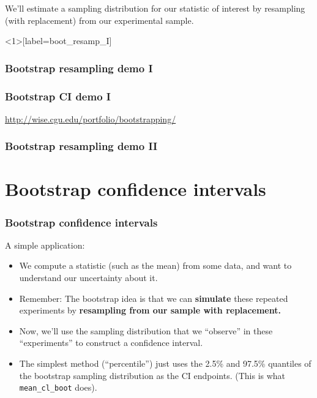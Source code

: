 \documentclass{beamer} %
\begin{document}
\begin{frame}[standout]
We'll estimate a sampling distribution for our statistic of interest by resampling (with replacement) from our experimental sample.
\end{frame}

\begin{frame}<1>[label=boot_resamp_I]
\frametitle<1>{Bootstrap resampling demo I}
\frametitle<2>{Bootstrap CI demo I}
\centering
\url{http://wise.cgu.edu/portfolio/bootstrapping/}
\end{frame}

\begin{frame}[label=boot_resamp_II]
\frametitle{Bootstrap resampling demo II}
\begin{figure}
\centering
{}
\end{figure}
\end{frame}

\section{Bootstrap confidence intervals}

\begin{frame}[fragile]
\frametitle{Bootstrap confidence intervals}
A simple application:
\begin{itemize}[<+(1)->] \itemsep 1em
\item We compute a statistic (such as the mean) from some data, and want to understand our uncertainty about it.
\item Remember: The bootstrap idea is that we can \textbf{simulate} these repeated experiments by \textbf{resampling from our sample with replacement.}
\item Now, we'll use the sampling distribution that we ``observe'' in these ``experiments'' to construct a confidence interval.
\item The simplest method (``percentile'') just uses the 2.5\% and 97.5\% quantiles of the bootstrap sampling distribution as the CI endpoints. (This is what \verb!mean_cl_boot! does).
\end{itemize}
\end{frame}
\end{document}
